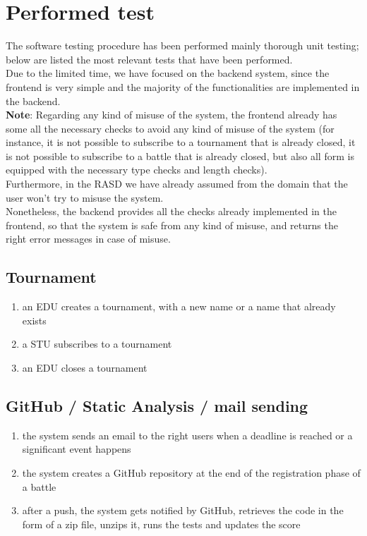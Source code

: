 \chapter{Performed test}

The software testing procedure has been performed mainly thorough unit testing; below are listed the most relevant tests that have been performed.\\
Due to the limited time, we have focused on the backend system, since the frontend is very simple and the majority of the functionalities are implemented in the backend.\\

\textbf{Note}: Regarding any kind of misuse of the system, the frontend already has some all the necessary checks to avoid any kind of misuse of the system (for instance, it is not possible to subscribe to a tournament that is already closed, it is not possible to subscribe to a battle that is already closed, but also all form is equipped with the necessary type checks and length checks).\\
Furthermore, in the RASD we have already assumed from the domain that the user won't try to misuse the system.\\
Nonetheless, the backend provides all the checks already implemented in the frontend, so that the system is safe from any kind of misuse, and returns the right error messages in case of misuse.

\section{Tournament}

\begin{enumerate}
    \item an EDU creates a tournament, with a new name or a name that already exists
    \item a STU subscribes to a tournament
    \item an EDU closes a tournament
\end{enumerate}

\section{GitHub / Static Analysis / mail sending}

\begin{enumerate}
    \item the system sends an email to the right users when a deadline is reached or a significant event happens
    \item the system creates a GitHub repository at the end of the registration phase of a battle
    \item after a push, the system gets notified by GitHub, retrieves the code in the form of a zip file, unzips it, runs the tests and updates the score
\end{enumerate}

